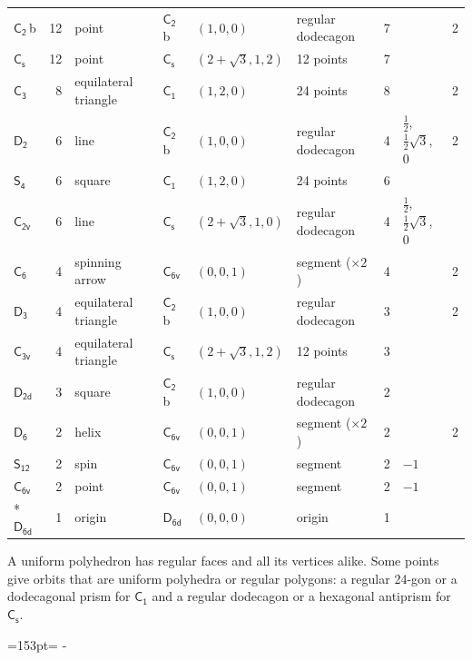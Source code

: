 \documentclass[10pt,a4paper]{article}
\newcommand{\needspace}[1]{\par\penalty-100\begingroup\dimen0=#1\relax\dimen2=\pagegoal
  \advance\dimen2-\pagetotal\ifdim\dimen0>\dimen2\relax\ifdim\dimen2>0pt\vfil\break\fi\fi
  \endgroup}
\numberwithin{equation}{section}
\newcommand{\grp}[1]{\mathsf{#1}}
\newcommand{\clsletter}[1]{\,{\scriptsize\color{black!55}#1}}
\newlength{\fillwidth}\newlength{\cellwidth}\newlength{\colwidth}
\begin{document}
{{\begin{longtable}{@{}lrllllr>{\RaggedRight\arraybackslash}p{\fillwidth}r@{}}
\href{C2.pdf}{$\grp{C_{2}}$}\clsletter{b} & 12 & point & \href{C2.pdf}{$\grp{C_{2}}$}\clsletter{b} & $(1, 0, 0)$ & regular dodecagon & 7 &  & 2\\
\href{C1v.pdf}{$\grp{C_{s}}$} & 12 & point & \href{C1v.pdf}{$\grp{C_{s}}$} & $(2 + \sqrt{3}, 1, 2)$ & 12 points & 7 &  & \\
\href{C3.pdf}{$\grp{C_{3}}$} & 8 & equilateral triangle & \href{C1.pdf}{$\grp{C_{1}}$} & $(1, 2, 0)$ & 24 points & 8 &  & 2\\
\href{D2.pdf}{$\grp{D_{2}}$} & 6 & line & \href{C2.pdf}{$\grp{C_{2}}$}\clsletter{b} & $(1, 0, 0)$ & regular dodecagon & 4 & ${\tfrac{1}{2}}$, ${\tfrac{1}{2}\sqrt{3}}$, ${0}$ & 2\\
\href{S4.pdf}{$\grp{S_{4}}$} & 6 & square & \href{C1.pdf}{$\grp{C_{1}}$} & $(1, 2, 0)$ & 24 points & 6 &  & \\
\href{C2v.pdf}{$\grp{C_{2v}}$} & 6 & line & \href{C1v.pdf}{$\grp{C_{s}}$} & $(2 + \sqrt{3}, 1, 0)$ & regular dodecagon & 4 & ${\tfrac{1}{2}}$, ${\tfrac{1}{2}\sqrt{3}}$, ${0}$ & \\
\href{C6.pdf}{$\grp{C_{6}}$} & 4 & spinning arrow & \href{C6v.pdf}{$\grp{C_{6v}}$} & $(0, 0, 1)$ & segment (${\times}2$) & 4 &  & 2\\
\href{D3.pdf}{$\grp{D_{3}}$} & 4 & equilateral triangle & \href{C2.pdf}{$\grp{C_{2}}$}\clsletter{b} & $(1, 0, 0)$ & regular dodecagon & 3 &  & 2\\
\href{C3v.pdf}{$\grp{C_{3v}}$} & 4 & equilateral triangle & \href{C1v.pdf}{$\grp{C_{s}}$} & $(2 + \sqrt{3}, 1, 2)$ & 12 points & 3 &  & \\
\href{D2d.pdf}{$\grp{D_{2d}}$} & 3 & square & \href{C2.pdf}{$\grp{C_{2}}$}\clsletter{b} & $(1, 0, 0)$ & regular dodecagon & 2 &  & \\
\href{D6.pdf}{$\grp{D_{6}}$} & 2 & helix & \href{C6v.pdf}{$\grp{C_{6v}}$} & $(0, 0, 1)$ & segment (${\times}2$) & 2 &  & 2\\
\href{S12.pdf}{$\grp{S_{12}}$} & 2 & spin & \href{C6v.pdf}{$\grp{C_{6v}}$} & $(0, 0, 1)$ & segment & 2 & ${-1}$ & \\
\href{C6v.pdf}{$\grp{C_{6v}}$} & 2 & point & \href{C6v.pdf}{$\grp{C_{6v}}$} & $(0, 0, 1)$ & segment & 2 & ${-1}$ & \\*
\href{D6d.pdf}{$\grp{D_{6d}}$} & 1 & origin & \href{D6d.pdf}{$\grp{D_{6d}}$} & $(0, 0, 0)$ & origin & 1 &  & \\
\bottomrule\end{longtable}}}
A uniform polyhedron has regular faces and all its vertices alike. Some points give orbits that are uniform polyhedra or regular polygons: a regular 24-gon or a dodecagonal prism for \href{C1.pdf}{$\grp{C_{1}}$} and a regular dodecagon or a hexagonal antiprism for \href{C1v.pdf}{$\grp{C_{s}}$}.
\needspace{153pt}
\end{document}
